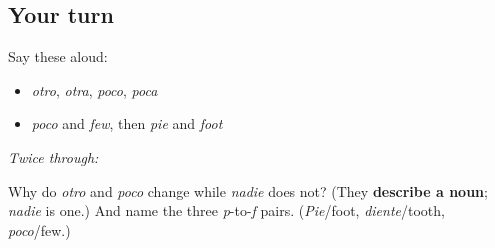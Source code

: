 \subsection*{Your turn}
Say these aloud:

\begin{itemize}
\raggedright
  \item \emph{otro}, \emph{otra}, \emph{poco}, \emph{poca}
  \item \emph{poco} and \emph{few}, then \emph{pie} and \emph{foot}
\end{itemize}

\emph{Twice through:}

\begin{tcolorbox}[breakable,colback=teal!4,colframe=teal!35!black,title={Before you move on}]
Why do \emph{otro} and \emph{poco} change while \emph{nadie} does not? (They \textbf{describe a noun}; \emph{nadie} is one.) And name the three \emph{p}-to-\emph{f} pairs. (\emph{Pie}/foot, \emph{diente}/tooth, \emph{poco}/few.)
\end{tcolorbox}
